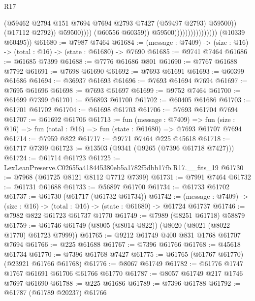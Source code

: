 \begin{lexlean}{R17}
\begin{coremodule}
                                                    (@59462
                                                      @2794
                                                      @151
                                                      @7694
                                                      @7694
                                                      @2793
                                                      @7427
                                                      (@59497 @2793)
                                                      @59500))
                                                  (@17112 @2792))
                                                @59500))))
                                        (@60556 @60359))
                                      @59500))))))))))))))))
      (@10339 @60495))
@61680 := @7987 @7464
@61684 := (message : @7409) -> (size : @16) -> (total : @16) -> (state : @61680) -> @7690
@61685 := @9741 @7464
@61686 := @61685 @7399
@61688 := @7776 @61686 @801
@61690 := @7767 @61688 @7792
@61691 := @7698 @61690
@61692 := @7693 @61691
@61693 := @60399 @61686
@61694 := @36937 @61693
@61696 := @7693 @61694 @7694
@61697 := @7695 @61696
@61698 := @7693 @61697
@61699 := @9752 @7464
@61700 := @61699 @7399
@61701 := @56893 @61700
@61702 := @60405 @61686
@61703 := @61701 @61702
@61704 := @61698 @61703
@61706 := @7693 @61704 @7694
@61707 := @61692 @61706
@61713 := fun (message : @7409) =>
  fun (size : @16) => fun (total : @16) => fun (state : @61680) => @7693 @61707 @7694
@61714 := @7959 @822
@61717 := @9771 @7464 @225 @45618
@61718 := @61717 @7399
@61723 := @13503 (@9341 (@9265 (@7396 @61718 @7427)))
@61724 := @61714 @61723
@61725 := LexLeanPreserve.C02655a418445380eb5a1782f5dbb17fb.R17.__fits_19
@61730 := @7968 (@61725 @8121 @8112 @7712 @7399)
@61731 := @7991 @7464
@61732 := @61731 @61688
@61733 := @56897 @61700
@61734 := @61733 @61702
@61737 := @61730 (@61717 (@61732 @61734))
@61742 := (message : @7409) -> (size : @16) -> (total : @16) -> (state : @61680) -> @61724 @61737
@61746 := @7982 @822 @61723 @61737 @1770
@61749 := @7989 (@8251 @61718) @58879
@61759 := @61746 @61749 (@8005 (@8014 @822)) (@8020 (@8021 (@8022 @1770) @61723 @7999))
@61765 := @9212 @61749 @400 @831 @1768 @61707 @7694
@61766 := @225 @61688
@61767 := @7396 @61766
@61768 := @45618 @61734
@61770 := @7396 @61768 @7427
@61775 := @61765 (@61767 @61770) (@23921 @61766 @61768)
@61776 := @8067 @61749
@61782 := @61776 @1747 @1767 @61691 @61706 @61766 @61770
@61787 := @8057 @61749 @217 @1746 @7697 @61690
@61788 := @225 @61686
@61789 := @7396 @61788
@61792 := @61787 (@61789 @20237) @61766

\end{coremodule}
\end{lexlean}
